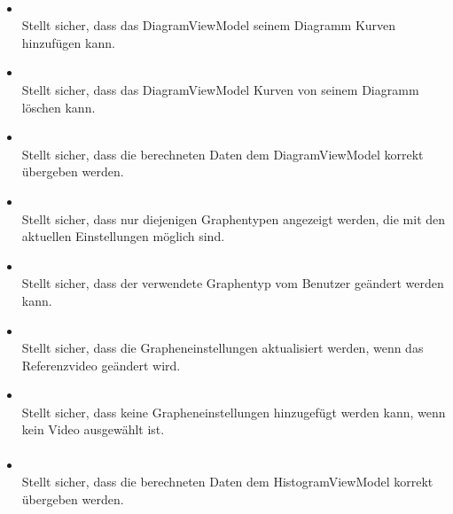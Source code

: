 \paragraph{}
\begin{itemize}
	\item{} \\
		Stellt sicher, dass das DiagramViewModel seinem Diagramm Kurven hinzufügen kann.

	\item{} \\
		Stellt sicher, dass das DiagramViewModel Kurven von seinem Diagramm löschen kann.

	\item{} \\
		Stellt sicher, dass die berechneten Daten dem DiagramViewModel korrekt übergeben werden.
	
	\item{} \\
		Stellt sicher, dass nur diejenigen Graphentypen angezeigt werden, die mit den aktuellen Einstellungen möglich sind.
	
	\item{} \\
		Stellt sicher, dass der verwendete Graphentyp vom Benutzer geändert werden kann.
	
	\item{} \\
		Stellt sicher, dass die Grapheneinstellungen aktualisiert werden, wenn das Referenzvideo geändert wird.
	
	\item{} \\
		Stellt sicher, dass keine Grapheneinstellungen hinzugefügt werden kann, wenn kein Video ausgewählt ist.
\end{itemize}


\paragraph{}
\begin{itemize}
	\item{} \\
		Stellt sicher, dass die berechneten Daten dem HistogramViewModel korrekt übergeben werden.
\end{itemize}
